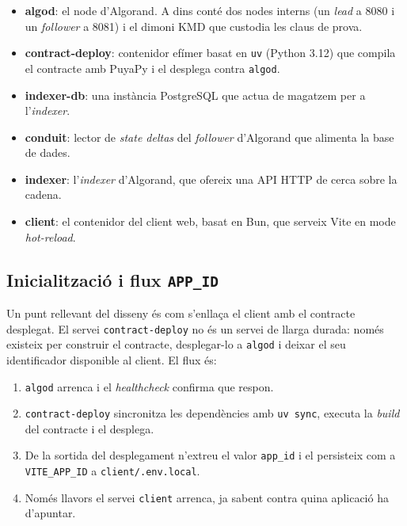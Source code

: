 \begin{itemize}
    \item \textbf{algod}: el node d'Algorand.
    A dins conté dos nodes interns (un \textit{lead} a 8080 i un \textit{follower} a 8081) i el dimoni \ac{KMD} que
    custodia les claus de prova.

    \item \textbf{contract-deploy}: contenidor efímer basat en \texttt{uv} (Python 3.12) que compila el contracte amb
    PuyaPy i el desplega contra \texttt{algod}.

    \item \textbf{indexer-db}: una instància PostgreSQL que actua de magatzem per a l'\textit{indexer}.

    \item \textbf{conduit}: lector de \textit{state deltas} del \textit{follower} d'Algorand que alimenta la base de
    dades.

    \item \textbf{indexer}: l'\textit{indexer} d'Algorand, que ofereix una \ac{API} HTTP de cerca sobre la cadena.

    \item \textbf{client}: el contenidor del client web, basat en Bun, que serveix Vite en mode \textit{hot-reload}.
\end{itemize}

\subsection{Inicialització i flux \texttt{APP\_ID}}
\label{subsec:inicialitzacio-i-flux-texttt{app_id}}

Un punt rellevant del disseny és com s'enllaça el client amb el contracte desplegat.
El servei \texttt{contract-deploy} no és un servei de llarga durada: només existeix per construir el contracte,
desplegar-lo a \texttt{algod} i deixar el seu identificador disponible al client.
El flux és:

\begin{enumerate}
    \item \texttt{algod} arrenca i el \textit{healthcheck} confirma que respon.

    \item \texttt{contract-deploy} sincronitza les dependències amb \texttt{uv sync}, executa la \textit{build} del
    contracte i el desplega.

    \item De la sortida del desplegament n'extreu el valor \texttt{app\_id} i el persisteix com a \texttt{VITE\_APP\_ID}
    a \texttt{client/.env.local}.

    \item Només llavors el servei \texttt{client} arrenca, ja sabent contra quina aplicació ha d'apuntar.
\end{enumerate}

